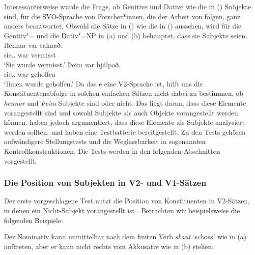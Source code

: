 \noindent
Interessanterweise wurde die Frage, ob Genitive und Dative wie die in () Subjekte sind, für
die SVO-Sprache  von Forscher*innen, die der Arbeit von
\citet*{ZMT85a} folgen, ganz anders beantwortet. Obwohl die Sätze in () wie die in ()
aussehen, wird für die Genitiv"= und die Dativ"=NP in (a) und (b) behauptet, dass sie Subjekte seien.
\eal
\label{ex-subject-icelandic-passive-v2}
\ex 
\gll Hennar var saknað.\\
     sie.\SG.\GEN{} war vermisst\\\icelandic
\glt `Sie wurde vermisst.'
\ex 
\gll Þeim            var hjálpað.\\
     sie.\PL.\DAT{} war geholfen\\
\glt `Ihnen wurde geholfen.'
\zl
Da das e eine V2-Sprache ist, hilft uns die Konstituentenabfolge in solchen einfachen Sätzen nicht dabei zu
bestimmen, ob \emph{hennar} und \emph{Þeim} Subjekte sind oder nicht. Das liegt daran, dass diese
Elemente vorangestellt sind und sowohl Subjekte als auch Objekte vorangestellt werden können. \citet*{ZMT85a} haben jedoch argumentiert, dass
diese Elemente als Subjekte analysiert werden sollten, und haben eine Testbatterie bereitgestellt. Zu den Tests gehören aufwändigere
Stellungstests und die Weglassbarkeit in sogenannten Kontrollkonstruktionen. Die Tests werden in den
folgenden Abschnitten vorgestellt.

\subsubsection{Die Position von Subjekten in V2- und V1-Sätzen}

Der erste vorgeschlagene Test nutzt die Position von Konstituenten in V2-Sätzen, in denen ein
Nicht-Subjekt vorangestellt ist \citep*[Abschnitt~2.3]{ZMT85a}. Betrachten wir beispielsweise die folgenden Beispiele:

\eal
\zl
Der Nominativ kann unmittelbar nach dem finiten Verb \emph{skaut} `schoss' wie in (a) auftreten, aber er
kann nicht rechts vom Akkusativ wie in (b) stehen.

